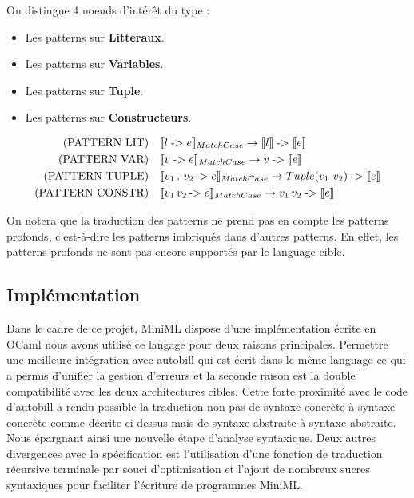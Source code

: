 \documentclass[12pt]{article}
\begin{document}
On distingue 4 noeuds d'intérêt du type :
\begin{itemize}
      \tightlist
      \item
            Les patterns sur \textbf{Litteraux}.
      \item
            Les patterns sur \textbf{Variables}.
      \item
            Les patterns sur \textbf{Tuple}.
      \item
            Les patterns sur \textbf{Constructeurs}.
\end{itemize}

\begin{align*}
      \text{(PATTERN LIT)} \quad    & \llbracket l \; \text{->} \; e \rrbracket_{MatchCase} \rightarrow \llbracket l \rrbracket \; \text{->} \; \llbracket e \rrbracket                \\
      \text{(PATTERN VAR)} \quad    & \llbracket v \; \text{->} \; e \rrbracket_{MatchCase} \rightarrow v \; \text{->} \; \llbracket e \rrbracket                                  \\
      \text{(PATTERN TUPLE)} \quad  & \llbracket v_1 \, , \, v_2 \, \text{->} \; e \rrbracket_{MatchCase} \rightarrow Tuple(v_1 \, \, v_2) \; \text{->} \; \llbracket e \rrbracket \\
      \text{(PATTERN CONSTR)} \quad & \llbracket v_1 \, v_2 \, \text{->} \; e \rrbracket_{MatchCase} \rightarrow v_1 \, v_2 \; \text{->} \; \llbracket e \rrbracket                \\
\end{align*}

On notera que la traduction des patterns ne prend pas en compte les patterns profonds, c'est-à-dire les patterns imbriqués dans d'autres patterns.
En effet, les patterns profonds ne sont pas encore supportés par le language cible.


\hypertarget{Implémentation}{%
      \subsection{Implémentation}\label{Implementation}}
Dans le cadre de ce projet, MiniML dispose d'une implémentation écrite en OCaml nous avons utilisé ce langage pour deux raisons principales.
Permettre une meilleure intégration avec autobill qui est écrit dans le même language ce qui a permis d'unifier la gestion d'erreurs
et la seconde raison est la double compatibilité avec les deux architectures cibles.
Cette forte proximité avec le code d'autobill a rendu possible la traduction non pas de syntaxe concrète à syntaxe concrète comme décrite ci-dessus mais de syntaxe abstraite à syntaxe abstraite.
Nous épargnant ainsi une nouvelle étape d'analyse syntaxique.
Deux autres divergences avec la spécification est l'utilisation d'une fonction de traduction récursive terminale par souci d'optimisation et l'ajout de nombreux sucres syntaxiques pour faciliter l'écriture de programmes MiniML.
\end{document}
